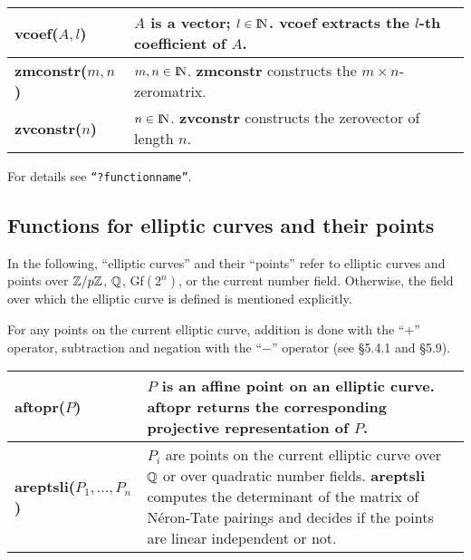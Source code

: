 {\newpage

\begin{tabular}{|p{1.95in}|p{3.83in}|} \hline

{\bf vcoef($A,l$)} &
$A$ is a vector; $l\in{\rm{I\!N}}$.\newline
{\bf vcoef} extracts the $l$-th coefficient of $A$.\\ \hline

{\bf zmconstr($m,n$)} &
$m,n \in{\rm{I\!N}}$.\newline
{\bf zmconstr} constructs the $m\times n$-zeromatrix.\\ \hline

{\bf zvconstr($n$)} &
$n\in{\rm{I\!N}}$.\newline
{\bf zvconstr} constructs the zerovector of length $n$.\\ \hline
\end{tabular}

\leer \leer
For details see {\tt ``?functionname''}.

\newpage

\subsection{Functions for elliptic curves and their points}
In the following, ``elliptic curves'' and their ``points''
refer to elliptic curves and points over $\mbox{$\mathbb Z$}/p\mbox{$\mathbb Z$}$, $\mbox{$\mathbb Q$}$, Gf$(2^n)$, or
the current number field. Otherwise, the field over which the elliptic
curve is defined is mentioned explicitly.

For any points on the current elliptic curve, addition is done with the ``$+$''
operator, subtraction and negation with the ``$-$'' operator (see \S 5.4.1
and \S 5.9).

\leer\leer
\begin{tabular}{|p{1.95in}|p{3.83in}|} \hline

{\bf aftopr($P$)} &
$P$ is an affine point on an elliptic curve.\newline
{\bf aftopr} returns the corresponding projective representation of $P$.\\ \hline

{\bf areptsli($P_1, ... ,P_n$)} &
$P_i$ are points on the current elliptic curve over $\mbox{$\mathbb Q$}$ or over 
quadratic number fields.\newline
{\bf areptsli} computes the determinant of the matrix of N\'eron-Tate pairings 
and decides if the points are linear independent or not.\\ \hline


\end{tabular}}
